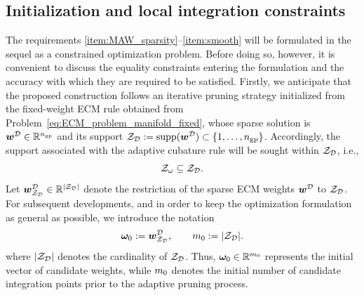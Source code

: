 \documentclass[11pt,a4paper]{article}
\newcommand{\PROMPT}[1]{ }
\begin{document}
%
%


\PROMPT{}

%  

\PROMPT{}

\subsection{Initialization and local integration constraints}
\label{sec:MAW_local_constraints}
%
%
%
The requirements \ref{item:MAW_sparsity}--\ref{item:smooth} will be formulated
in the sequel as a constrained optimization problem. Before doing so, however,
it is convenient to discuss the equality constraints entering the formulation
and the accuracy with which they are required to be satisfied. Firstly, we anticipate that the proposed construction follows an iterative
pruning strategy initialized from the fixed-weight ECM rule obtained from
Problem~\eqref{eq:ECM_problem_manifold_fixed}, whose sparse solution is \(\bm{w}^{\mathcal{D}}\in\mathbb{R}^{n_{\mathrm{gp}}}\) and its support $  \mathcal{Z}_{\mathcal{D}}:=\operatorname{supp}(\bm{w}^{\mathcal{D}})
    \subset\{1,\ldots,n_{\mathrm{gp}}\}$.    Accordingly, the support associated with the adaptive cubature rule will be
sought within $\mathcal{Z}_{\mathcal{D}}$, i.e.,
\[
    \mathcal{Z}_{\omega} \subseteq \mathcal{Z}_{\mathcal{D}} .
\]
Let $\bm{w}^{\mathcal{D}}_{\mathcal{Z}_{\mathcal{D}}}\in\mathbb{R}^{|\mathcal{Z}_{\mathcal{D}}|}$ denote the restriction of the sparse ECM weights \(\bm{w}^{\mathcal{D}}\) to
\(\mathcal{Z}_{\mathcal{D}}\). For subsequent developments, and in order to keep the optimization
formulation as general as possible, we introduce the notation
\[
    \bm{\omega}_0 := \bm{w}^{\mathcal{D}}_{\mathcal{Z}_{\mathcal{D}}},
    \qquad
    m_0 := |\mathcal{Z}_{\mathcal{D}}| .
\]
where $|\mathcal{Z}_{\mathcal{D}}|$ denotes the cardinality of $\mathcal{Z}_{\mathcal{D}}$. Thus, \(\bm{\omega}_0\in\mathbb{R}^{m_0}\) represents the initial vector of
candidate weights, while \(m_0\) denotes the initial number of candidate
integration points prior to the adaptive pruning process.
\end{document}
